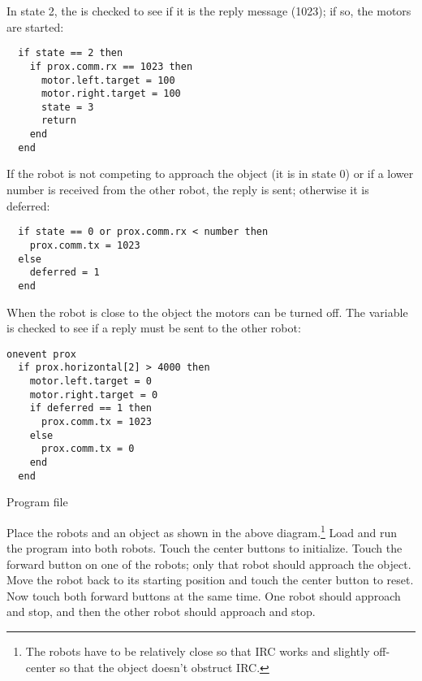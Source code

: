 In state 2, the  is checked to see if it is the reply
message (1023); if so, the motors are started:
\begin{verbatim}
  if state == 2 then
    if prox.comm.rx == 1023 then
      motor.left.target = 100
      motor.right.target = 100
      state = 3
      return
    end
  end
\end{verbatim}

If the robot is not competing to approach the object (it is in state 0)
or if a lower number is received from the other robot, the reply is
sent; otherwise it is deferred:
 
\begin{verbatim}
  if state == 0 or prox.comm.rx < number then
    prox.comm.tx = 1023
  else
    deferred = 1
  end
\end{verbatim}

When the robot is close to the object the motors can be turned off. The
variable  is checked to see if a reply must be sent to the
other robot:

\begin{verbatim}
onevent prox
  if prox.horizontal[2] > 4000 then
    motor.left.target = 0
    motor.right.target = 0
    if deferred == 1 then
      prox.comm.tx = 1023
    else
      prox.comm.tx = 0	
    end
  end
\end{verbatim}

{\raggedleft \hfill Program file }


Place the robots and an object as shown in the above
diagram.\footnote{The robots have to be relatively close so that IRC
works and slightly off-center so that the object doesn't obstruct IRC.}
Load and run the program into both robots. Touch the center buttons to
initialize. Touch the forward button on one of the robots; only that
robot should approach the object. Move the robot back to its starting
position and touch the center button to reset. Now touch both forward
buttons at the same time. One robot should approach and stop, and then
the other robot should approach and stop.
